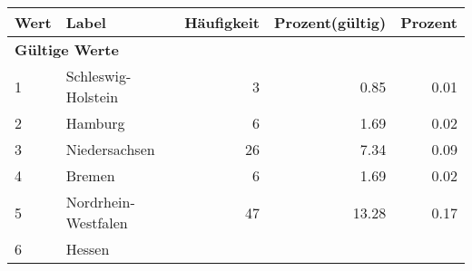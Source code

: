      \begin{longtable}{lXrrr}
     \toprule
     \textbf{Wert} & \textbf{Label} & \textbf{Häufigkeit} & \textbf{Prozent(gültig)} & \textbf{Prozent} \\
     \endhead
     \midrule
     \multicolumn{5}{l}{\textbf{Gültige Werte}}\\

     1 &
     \multicolumn{1}{X}{ Schleswig-Holstein   } &


       \num{3} &
       \num[round-mode=places,round-precision=2]{0.85} &
         \num[round-mode=places,round-precision=2]{0.01} \\

     2 &
     \multicolumn{1}{X}{ Hamburg   } &


       \num{6} &
       \num[round-mode=places,round-precision=2]{1.69} &
         \num[round-mode=places,round-precision=2]{0.02} \\

     3 &
     \multicolumn{1}{X}{ Niedersachsen   } &


       \num{26} &
       \num[round-mode=places,round-precision=2]{7.34} &
         \num[round-mode=places,round-precision=2]{0.09} \\

     4 &
     \multicolumn{1}{X}{ Bremen   } &


       \num{6} &
       \num[round-mode=places,round-precision=2]{1.69} &
         \num[round-mode=places,round-precision=2]{0.02} \\

     5 &
     \multicolumn{1}{X}{ Nordrhein-Westfalen   } &


       \num{47} &
       \num[round-mode=places,round-precision=2]{13.28} &
         \num[round-mode=places,round-precision=2]{0.17} \\

     6 &
     \multicolumn{1}{X}{ Hessen   } &



\end{longtable}

